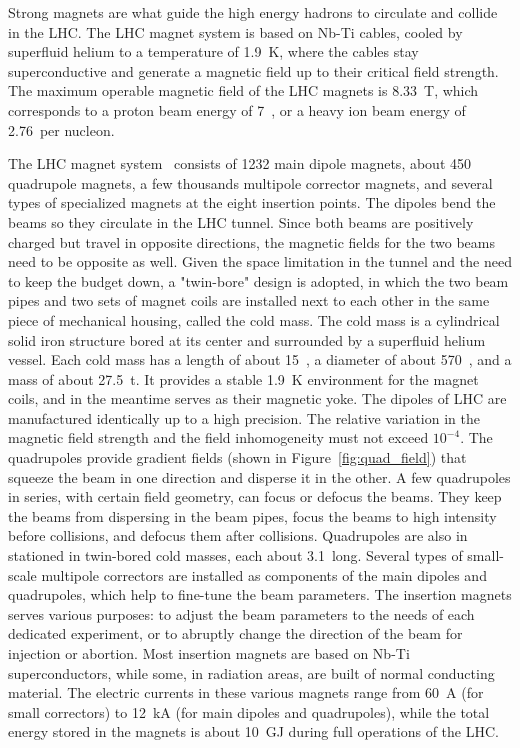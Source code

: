 Strong magnets are what guide the high energy hadrons to circulate and collide in the LHC. 
The LHC magnet system is based on Nb-Ti cables, cooled by superfluid helium to a temperature of 1.9~K,
where the cables stay superconductive and generate a magnetic field up to their critical field strength.
The maximum operable magnetic field of the LHC magnets is 8.33~T, which corresponds to a proton beam energy of 7~\TeV,
or a heavy ion beam energy of 2.76~\TeV per nucleon.

The LHC magnet system~\cite{Evans_2008} consists of 1232 main dipole magnets, about 450 quadrupole magnets,
a few thousands multipole corrector magnets, and several types of specialized magnets at the eight insertion points.
The dipoles 
bend the beams so they circulate in the LHC tunnel.
Since both beams are positively charged but travel in opposite directions,
the magnetic fields for the two beams need to be opposite as well.
Given the space limitation in the tunnel and the need to keep the budget down, a "twin-bore" design is adopted, 
in which the two beam pipes and two sets of magnet coils are installed next to each other in the same piece of mechanical housing, called the cold mass.
The cold mass is a cylindrical solid iron structure bored at its center and surrounded by a superfluid helium vessel.
Each cold mass has a length of about 15~\meter, a diameter of about 570~\mm, and a mass of about 27.5~t.
It provides a stable 1.9~K environment for the magnet coils, and in the meantime serves as their magnetic yoke.
The dipoles of LHC are manufactured identically up to a high precision.
The relative variation in the magnetic field strength and the field inhomogeneity must not exceed $10^{-4}$.
The quadrupoles 
provide gradient fields (shown in Figure~\ref{fig:quad_field}) that squeeze the beam in one direction and disperse it in the other.
A few quadrupoles in series, with certain field geometry, can focus or defocus the beams.
They keep the beams from dispersing in the beam pipes, focus the beams to high intensity before collisions, and defocus them after collisions.
Quadrupoles are also in stationed in twin-bored cold masses, each about 3.1~\meter long.
Several types 
of small-scale multipole correctors are installed as components of the main dipoles and quadrupoles, 
which help to fine-tune the beam parameters. 
The insertion magnets 
serves various purposes: to adjust the beam parameters to the needs of each dedicated experiment, 
or to abruptly change the direction of the beam for injection or abortion.
Most insertion magnets are based on Nb-Ti superconductors, 
while some, in radiation areas, are built of normal conducting material.
The electric currents in these various magnets range from 60~A (for small correctors) to 12~kA (for main dipoles and quadrupoles),
while the total energy stored in the magnets is about 10~GJ during full operations of the LHC.


